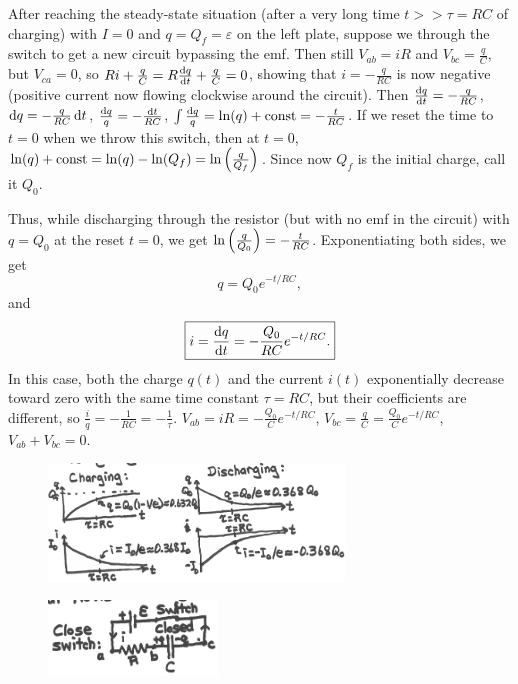 After reaching the steady-state situation (after a very long time $t >> \tau = RC$ of charging) with $I = 0$ and $q = Q_f = \varepsilon$ on the left plate, suppose we through the switch to get a new circuit bypassing the emf. Then still $V_{ab} = iR$ and $V_{bc} = \frac{q}{C}$, but $V_{ca} = 0$, so $Ri + \frac{q}{C} = R\frac{\operatorname{d\!} q}{\operatorname{d\!} t} + \frac{q}{C} = 0$, showing that $i = -\frac{q}{RC}$ is now negative (positive current now flowing clockwise around the circuit). Then $\frac{\operatorname{d\!} q}{\operatorname{d\!} t} = -\frac{q}{RC}$, $\operatorname{d\!} q = -\frac{q}{RC} \operatorname{d\!} t$, $\frac{\operatorname{d\!} q}{q} = -\frac{\operatorname{d\!} t}{RC}$, $\int\frac{\operatorname{d\!} q}{q} = \ln(q) + \text{const} = -\frac{t}{RC}$. If we reset the time to $t = 0$ when we throw this switch, then at $t=0$, $\ln(q) + \text{const} = \ln(q) - \ln(Q_f) = \ln\left( \frac{q}{Q_f} \right)$. Since now $Q_f$ is the initial charge, call it $Q_0$.

Thus, while discharging through the resistor (but with no emf in the circuit) with $q = Q_0$ at the reset $t=0$, we get $\ln\left( \frac{q}{Q_0} \right) = -\frac{t}{RC}$. Exponentiating both sides, we get
\begin{equation}
\boxed{ q = Q_0 e^{-t/RC}, }
\end{equation}
and
\begin{equation}
\boxed{ i = \dfrac{\operatorname{d\!} q}{\operatorname{d\!} t} = -\dfrac{Q_0}{RC}e^{-t/RC}. }
\end{equation}
In this case, both the charge $q(t)$ and the current $i(t)$ exponentially decrease toward zero with the same time constant $\tau = RC$, but their coefficients are different, so $\frac{i}{q} = -\frac{1}{RC} = -\frac{1}{\tau}$. $V_{ab} = iR = -\frac{Q_0}{C} e^{-t/RC}$, $V_{bc} = \frac{q}{C} = \frac{Q_0}{C} e^{-t/RC}$, $V_{ab} + V_{bc} = 0$.
\begin{figure}[h]
\centering
\includegraphics[width=0.7\textwidth]{Images/charging.PNG}
\end{figure}

\begin{figure}[h]
\centering
\includegraphics[width=0.4\textwidth]{Images/closedcct.PNG}
\end{figure}

